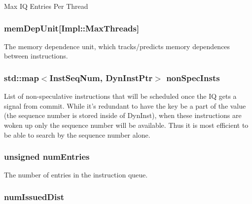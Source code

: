 \label{classInstructionQueue_a51e5f9f0cb40d61e95b1518f1be90b73}
Max IQ Entries Per Thread \hypertarget{classInstructionQueue_a8cb80ccbf6ed6c1029c6d9ebeaa40f6e}{
\subsubsection[{memDepUnit}]{ {\bf memDepUnit}\mbox{[}Impl::MaxThreads\mbox{]}}}
\label{classInstructionQueue_a8cb80ccbf6ed6c1029c6d9ebeaa40f6e}
The memory dependence unit, which tracks/predicts memory dependences between instructions. \hypertarget{classInstructionQueue_ac0ba4d07026aaf6386c001a68d059cbf}{
\subsubsection[{nonSpecInsts}]{\setlength{\rightskip}{0pt plus 5cm}std::map$<${\bf InstSeqNum}, {\bf DynInstPtr}$>$ {\bf nonSpecInsts}}}
\label{classInstructionQueue_ac0ba4d07026aaf6386c001a68d059cbf}
List of non-\/speculative instructions that will be scheduled once the IQ gets a signal from commit. While it's redundant to have the key be a part of the value (the sequence number is stored inside of DynInst), when these instructions are woken up only the sequence number will be available. Thus it is most efficient to be able to search by the sequence number alone. \hypertarget{classInstructionQueue_a325de474a9f6652329339d9fc2ea09c0}{
\subsubsection[{numEntries}]{\setlength{\rightskip}{0pt plus 5cm}unsigned {\bf numEntries}}}
\label{classInstructionQueue_a325de474a9f6652329339d9fc2ea09c0}
The number of entries in the instruction queue. \hypertarget{classInstructionQueue_a90810f5beb7dff46f4b45f96620474b6}{
\subsubsection[{numIssuedDist}]{ {\bf numIssuedDist}}}
